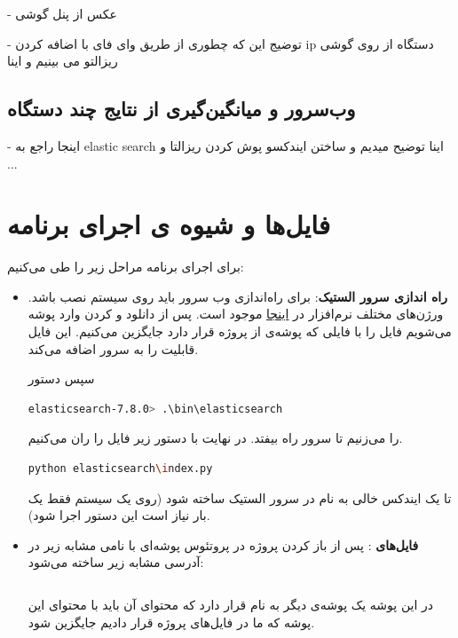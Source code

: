 - عکس از پنل گوشی

- توضیج این که چطوری از طریق وای فای با اضافه کردن ip دستگاه از روی گوشی ریزالتو می بینیم و اینا

\subsection{وب‌سرور و میانگین‌گیری از نتایج چند دستگاه}
- اینجا راجع به  
elastic search
 اینا توضیح میدیم و ساختن ایندکسو پوش کردن ریزالتا و ...

\section{فایل‌ها و شیوه ‌ی اجرای برنامه}
برای اجرای برنامه مراحل زیر را طی می‌کنیم:
\begin{itemize}
	\item 
	\textbf{راه اندازی سرور الستیک}:
	برای راه‌اندازی وب سرور باید  
	روی سیستم نصب باشد. ورژن‌های مختلف نرم‌افزار در 
	\href{https://www.elastic.co/downloads/elasticsearch}{اینجا}
	موجود است. پس از دانلود و 
	کردن وارد پوشه می‌شویم فایل 
	را با فایلی که پوشه‌ی 
	از پروژه قرار دارد جایگزین می‌کنیم. این فایل قابلیت 
	را به سرور اضافه می‌کند. 
	
	 سپس دستور 
\begin{latin}
\begin{lstlisting}[language=bash]
elasticsearch-7.8.0> .\bin\elasticsearch
\end{lstlisting}
\end{latin}
را می‌زنیم تا سرور راه بیفتد. در نهایت با دستور زیر فایل 
را ران می‌کنیم.  
\begin{latin}
\begin{lstlisting}[language=bash]
python elasticsearch\index.py
\end{lstlisting}
\end{latin}
تا یک ایندکس خالی به نام 
در سرور الستیک ساخته شود (روی یک سیستم فقط یک بار نیاز است این دستور اجرا شود). 
	\item 
	\textbf{فایل‌های }:
	پس از باز کردن پروژه در پروتئوس پوشه‌ای با نامی مشابه زیر در آدرسی مشابه زیر ساخته می‌شود:
\begin{latin}
\begin{lstlisting}[language=bash]

\end{lstlisting}
\end{latin}	
در این پوشه یک پوشه‌ی دیگر به نام 
قرار دارد که محتوای آن باید با محتوای این پوشه که ما در فایل‌های پروژه قرار دادیم جایگزین شود. 
		

\end{itemize}
